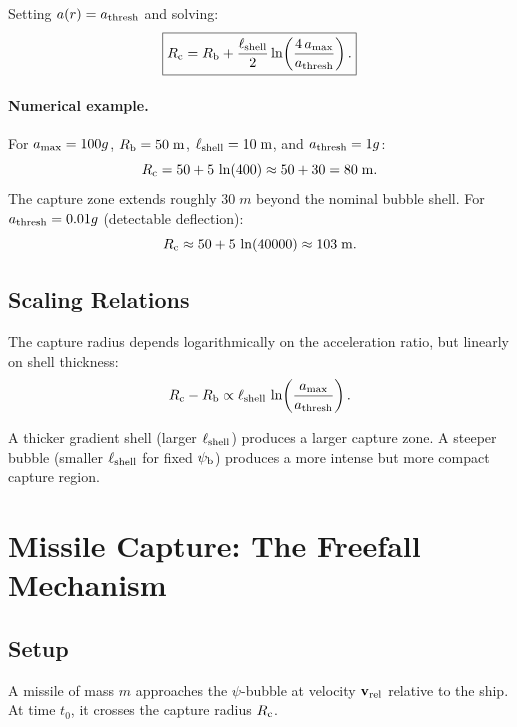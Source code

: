 \documentclass[12pt,aps,prd,superscriptaddress,nofootinbib]{revtex4-2}
\newcommand{\psib}{\psi_{\rm b}}
\newcommand{\Rb}{R_{\rm b}}
\newcommand{\Rc}{R_{\rm c}}
\newcommand{\Lshell}{\ell_{\rm shell}}
\begin{document}
Setting $a(r) = a_{\rm thresh}$ and solving:
\begin{equation}
\boxed{\Rc = \Rb + \frac{\Lshell}{2}\ln\!\left(
  \frac{4\,a_{\rm max}}{a_{\rm thresh}}\right).}
\label{eq:capture-radius}
\end{equation}

\paragraph{Numerical example.}
For $a_{\rm max} = 100g$, $\Rb = 50\;\si{m}$,
$\Lshell = 10\;\si{m}$, and $a_{\rm thresh} = 1g$:
\begin{equation}
\Rc = 50 + 5\,\ln(400) \approx 50 + 30 = 80\;\si{m}.
\end{equation}
The capture zone extends roughly $30\;\si{m}$ beyond the nominal
bubble shell. For $a_{\rm thresh} = 0.01g$ (detectable deflection):
\begin{equation}
\Rc \approx 50 + 5\,\ln(40000) \approx 103\;\si{m}.
\end{equation}

\subsection{Scaling Relations}

The capture radius depends logarithmically on the acceleration ratio,
but linearly on shell thickness:
\begin{equation}
\Rc - \Rb \propto \Lshell\,\ln\!\left(
  \frac{a_{\rm max}}{a_{\rm thresh}}\right).
\end{equation}

A thicker gradient shell (larger $\Lshell$) produces a larger
capture zone. A steeper bubble (smaller $\Lshell$ for fixed $\psib$)
produces a more intense but more compact capture region.


\section{Missile Capture: The Freefall Mechanism}\label{sec:missile}

\subsection{Setup}

A missile of mass $m$ approaches the $\psi$-bubble at velocity
$\mathbf{v}_{\rm rel}$ relative to the ship. At time $t_0$, it
crosses the capture radius $\Rc$.
\end{document}
